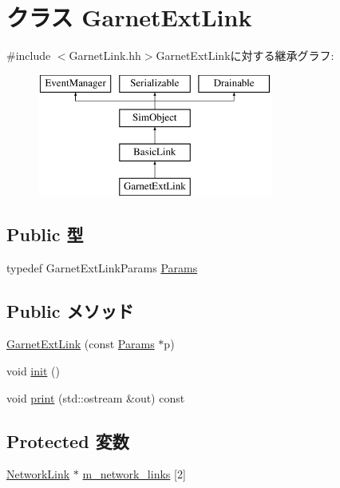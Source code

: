 \hypertarget{classGarnetExtLink}{
\section{クラス GarnetExtLink}
\label{classGarnetExtLink}
}


{\ttfamily \#include $<$GarnetLink.hh$>$}GarnetExtLinkに対する継承グラフ:\begin{figure}[H]
\begin{center}
\leavevmode
\includegraphics[height=4cm]{classGarnetExtLink}
\end{center}
\end{figure}
\subsection*{Public 型}
\begin{DoxyCompactItemize}
\item 
typedef GarnetExtLinkParams \hyperlink{classGarnetExtLink_abc394670035aa22f4cda698826986c13}{Params}
\end{DoxyCompactItemize}
\subsection*{Public メソッド}
\begin{DoxyCompactItemize}
\item 
\hyperlink{classGarnetExtLink_ab088e036def131358749fd8bf28c31d7}{GarnetExtLink} (const \hyperlink{classGarnetExtLink_abc394670035aa22f4cda698826986c13}{Params} $\ast$p)
\item 
void \hyperlink{classGarnetExtLink_a02fd73d861ef2e4aabb38c0c9ff82947}{init} ()
\item 
void \hyperlink{classGarnetExtLink_ac55fe386a101fbae38c716067c9966a0}{print} (std::ostream \&out) const 
\end{DoxyCompactItemize}
\subsection*{Protected 変数}
\begin{DoxyCompactItemize}
\item 
\hyperlink{classNetworkLink}{NetworkLink} $\ast$ \hyperlink{classGarnetExtLink_a94c05b942b28036b0b5ae2a8c639f068}{m\_\-network\_\-links} \mbox{[}2\mbox{]}
\end{DoxyCompactItemize}
